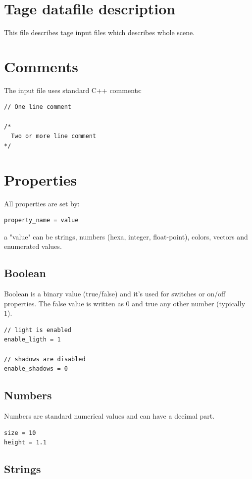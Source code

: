 \documentclass[9pt]{article}
\begin{document}
\section{Tage datafile description}

This file describes tage input files which describes whole scene.

\section{Comments}

The input file uses standard C++ comments:
\begin{verbatim}
// One line comment

/*
  Two or more line comment
*/
\end{verbatim}

\section{Properties}

All properties are set by:
\begin{verbatim}
property_name = value
\end{verbatim}
a "value" can be strings, numbers (hexa, integer, float-point), colors, vectors
and enumerated values.

\subsection{Boolean}

Boolean is a binary value (true/false) and it's used for switches
or on/off properties. The false value is written as 0 and true any other
number (typically 1).
\begin{verbatim}
// light is enabled 
enable_ligth = 1

// shadows are disabled
enable_shadows = 0
\end{verbatim}

\subsection{Numbers}

Numbers are standard numerical values and can have a decimal part.
\begin{verbatim}
size = 10
height = 1.1
\end{verbatim}

\subsection{Strings}
\end{document}
